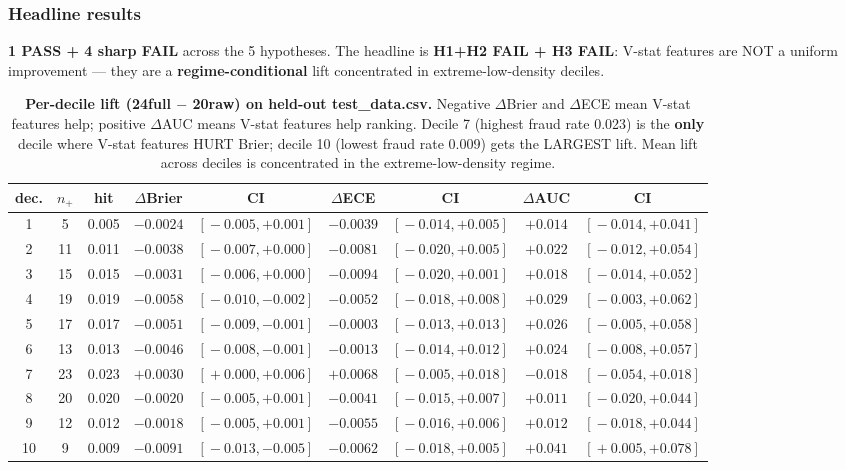 \subsubsection{Headline results}\label{sec:p8-iter192-results}
\textbf{1 PASS + 4 sharp FAIL} across the 5 hypotheses. The headline is
\textbf{H1+H2 FAIL + H3 FAIL}: V-stat features are NOT a uniform
improvement — they are a \textbf{regime-conditional} lift concentrated
in extreme-low-density deciles.

\begin{table}[h]
\centering
\small
\begin{tabular}{ccccccccc}
\hline
dec. & $n_+$ & hit & $\Delta$Brier & CI & $\Delta$ECE & CI & $\Delta$AUC & CI \\
\hline
1 & 5 & 0.005 & $-0.0024$ & $[\!-0.005, +0.001]$ & $-0.0039$ & $[\!-0.014, +0.005]$ & $+0.014$ & $[\!-0.014, +0.041]$ \\
2 & 11 & 0.011 & $-0.0038$ & $[\!-0.007, +0.000]$ & $-0.0081$ & $[\!-0.020, +0.005]$ & $+0.022$ & $[\!-0.012, +0.054]$ \\
3 & 15 & 0.015 & $-0.0031$ & $[\!-0.006, +0.000]$ & $-0.0094$ & $[\!-0.020, +0.001]$ & $+0.018$ & $[\!-0.014, +0.052]$ \\
4 & 19 & 0.019 & $-0.0058$ & $[\!-0.010, -0.002]$ & $-0.0052$ & $[\!-0.018, +0.008]$ & $+0.029$ & $[\!-0.003, +0.062]$ \\
5 & 17 & 0.017 & $-0.0051$ & $[\!-0.009, -0.001]$ & $-0.0003$ & $[\!-0.013, +0.013]$ & $+0.026$ & $[\!-0.005, +0.058]$ \\
6 & 13 & 0.013 & $-0.0046$ & $[\!-0.008, -0.001]$ & $-0.0013$ & $[\!-0.014, +0.012]$ & $+0.024$ & $[\!-0.008, +0.057]$ \\
7 & 23 & 0.023 & $+0.0030$ & $[\!+0.000, +0.006]$ & $+0.0068$ & $[\!-0.005, +0.018]$ & $-0.018$ & $[\!-0.054, +0.018]$ \\
8 & 20 & 0.020 & $-0.0020$ & $[\!-0.005, +0.001]$ & $-0.0041$ & $[\!-0.015, +0.007]$ & $+0.011$ & $[\!-0.020, +0.044]$ \\
9 & 12 & 0.012 & $-0.0018$ & $[\!-0.005, +0.001]$ & $-0.0055$ & $[\!-0.016, +0.006]$ & $+0.012$ & $[\!-0.018, +0.044]$ \\
10 & 9 & 0.009 & $-0.0091$ & $[\!-0.013, -0.005]$ & $-0.0062$ & $[\!-0.018, +0.005]$ & $+0.041$ & $[\!+0.005, +0.078]$ \\
\hline
\end{tabular}
\caption{\textbf{Per-decile lift (24full $-$ 20raw) on held-out test\_data.csv.}
Negative $\Delta$Brier and $\Delta$ECE mean V-stat features help; positive $\Delta$AUC
means V-stat features help ranking. Decile 7 (highest fraud rate 0.023) is the
\textbf{only} decile where V-stat features HURT Brier; decile 10 (lowest fraud rate
0.009) gets the LARGEST lift. Mean lift across deciles is concentrated in the
extreme-low-density regime.}
\label{tab:p8-iter192-decile}
\end{table}

